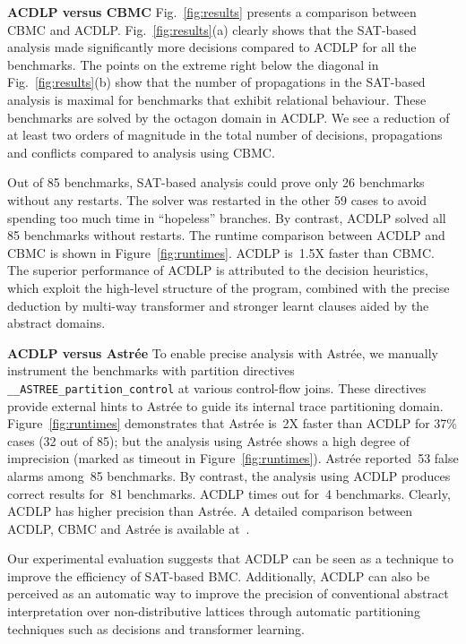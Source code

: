 

%

\medskip

\noindent \textbf{ACDLP versus CBMC}
Fig.~\ref{fig:results} presents a comparison between CBMC
and ACDLP.  Fig.~\ref{fig:results}(a) clearly shows that the SAT-based analysis 
made significantly more decisions compared to ACDLP for all the benchmarks. 
The points on the extreme right below the diagonal in
Fig.~\ref{fig:results}(b) show that the number of propagations in the SAT-based 
analysis is maximal for benchmarks that exhibit relational behaviour.  These
benchmarks are solved by the octagon domain in ACDLP.  We see a reduction of at 
least two orders of magnitude in the total number of decisions, propagations 
and conflicts compared to analysis using CBMC.  

Out of 85 benchmarks, SAT-based analysis could prove only 26
benchmarks without any restarts.  The solver was restarted in the other 59 
cases to avoid spending too much time in ``hopeless'' branches.  By contrast, 
ACDLP solved all 85 benchmarks without restarts.  
The runtime comparison between ACDLP and CBMC is shown in 
Figure~\ref{fig:runtimes}.  ACDLP is~1.5X faster than CBMC. 
The superior performance of ACDLP is attributed to the decision heuristics, 
which exploit the high-level structure of the program, combined with the 
precise deduction by multi-way transformer and stronger learnt clauses aided 
by the abstract domains. 
%

\medskip

\noindent \textbf{ACDLP versus Astr{\'e}e}
%
To enable precise analysis with Astr{\'e}e, we manually instrument the
benchmarks with partition directives \texttt{\_\_ASTREE\_partition\_control}
at various control-flow joins.  These directives provide external hints to
Astr{\'e}e to guide its internal trace partitioning domain. 
Figure~\ref{fig:runtimes} demonstrates that Astr{\'e}e is~2X faster than
ACDLP for {37}\% cases (32 out of 85); but the analysis using Astr{\'e}e
shows a high degree of imprecision (marked as timeout in
Figure~\ref{fig:runtimes}).  Astr{\'e}e reported~53 false alarms among~85
benchmarks.  By contrast, the analysis using ACDLP produces correct results
for~81 benchmarks.  ACDLP times out for~4 benchmarks.  Clearly, ACDLP has
higher precision than Astr{\'e}e.  A detailed comparison between ACDLP, 
CBMC and Astr{\'e}e is available at~\cite{extended}.
%


Our experimental evaluation suggests that ACDLP can be seen as a
technique to improve the efficiency of SAT-based BMC.  Additionally, ACDLP can
also be perceived as an automatic way to improve the precision of conventional
abstract interpretation over non-distributive lattices through automatic
partitioning techniques such as decisions and transformer learning.
